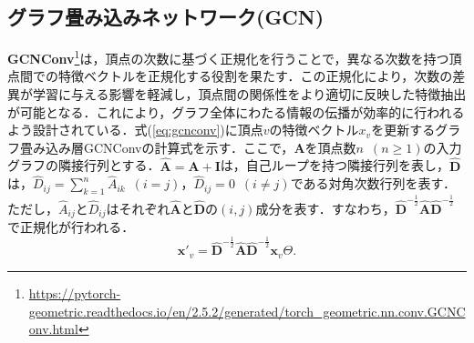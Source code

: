 \subsection{グラフ畳み込みネットワーク(GCN)}

\textbf{GCNConv}\footnote{\url{https://pytorch-geometric.readthedocs.io/en/2.5.2/generated/torch_geometric.nn.conv.GCNConv.html}}\cite{pyg-gcnconv}は，頂点の次数に基づく正規化を行うことで，異なる次数を持つ頂点間での特徴ベクトルを正規化する役割を果たす．この正規化により，次数の差異が学習に与える影響を軽減し，頂点間の関係性をより適切に反映した特徴抽出が可能となる．これにより，グラフ全体にわたる情報の伝播が効率的に行われるよう設計されている．式(\ref{eq:gcnconv})に頂点$v$の特徴ベクトル$x_v$を更新するグラフ畳み込み層GCNConvの計算式を示す．ここで，$\textbf{A}$を頂点数$n$~$(n\geq 1)$の入力グラフの隣接行列とする．$\hat{\textbf{A}}=\textbf{A}+\textbf{I}$は，自己ループを持つ隣接行列を表し，$\hat{\textbf{D}}$は，$\hat{D}_{ij}=\sum_{k=1}^{n}\hat{A}_{ik}$~$(i=j)$，$\hat{D}_{ij}=0$~$(i\not=j)$である対角次数行列を表す．ただし，$\hat{A}_{ij}$と$\hat{D}_{ij}$はそれぞれ$\hat{\textbf{A}}$と$\hat{\textbf{D}}$の$(i,j)$成分を表す．すなわち，$\hat{\textbf{D}}^{-\frac{1}{2}}\hat{\textbf{A}}\hat{\textbf{D}}^{-\frac{1}{2}}$で正規化が行われる．
\begin{equation}
  \label{eq:gcnconv}
  \bm{x}'_{v} = \hat{\textbf{D}}^{-\frac{1}{2}}\hat{\textbf{A}}\hat{\textbf{D}}^{-\frac{1}{2}}\bm{x}_{v}\Theta.
\end{equation}

